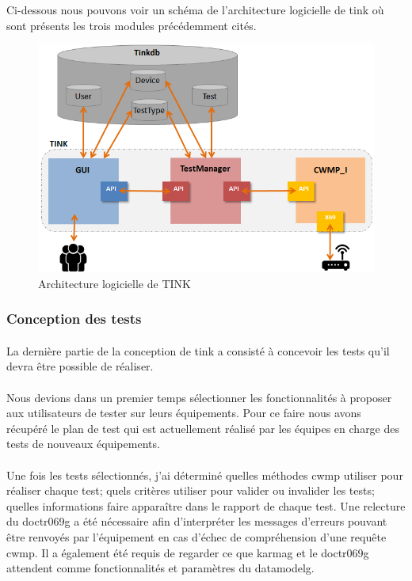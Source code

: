 \documentclass[12pt,a4paper]{report}
\begin{document}
Ci-dessous nous pouvons voir un schéma de l'architecture logicielle de \gls{tink} où sont présents les trois modules précédemment cités.
\begin{figure}[!ht]
    \center
    \includegraphics[scale=0.87]{./img/archi_logi.png}
    \caption{Architecture logicielle de TINK}
\end{figure}
\newpage

\subsubsection{Conception des tests}
\paragraph*{}La dernière partie de la conception de \gls{tink} a consisté à concevoir les tests qu'il devra être possible de réaliser. 
\paragraph*{}Nous devions dans un premier temps sélectionner les fonctionnalités à proposer aux utilisateurs de tester sur leurs équipements. Pour ce faire nous avons récupéré le plan de test qui est actuellement réalisé par les équipes en charge des tests de nouveaux équipements.   
\paragraph*{}Une fois les tests sélectionnés, j'ai déterminé quelles méthodes \gls{cwmp} utiliser pour réaliser chaque test; quels critères utiliser pour valider ou invalider les tests; quelles informations faire apparaître dans le rapport de chaque test. Une relecture du \gls{doctr069g} a été nécessaire afin d'interpréter les messages d'erreurs pouvant être renvoyés par l'équipement en cas d'échec de compréhension d'une requête \gls{cwmp}. Il a également été requis de regarder ce que \gls{karmag} et le \gls{doctr069g} attendent comme fonctionnalités et paramètres du \gls{datamodelg}.
\end{document}
